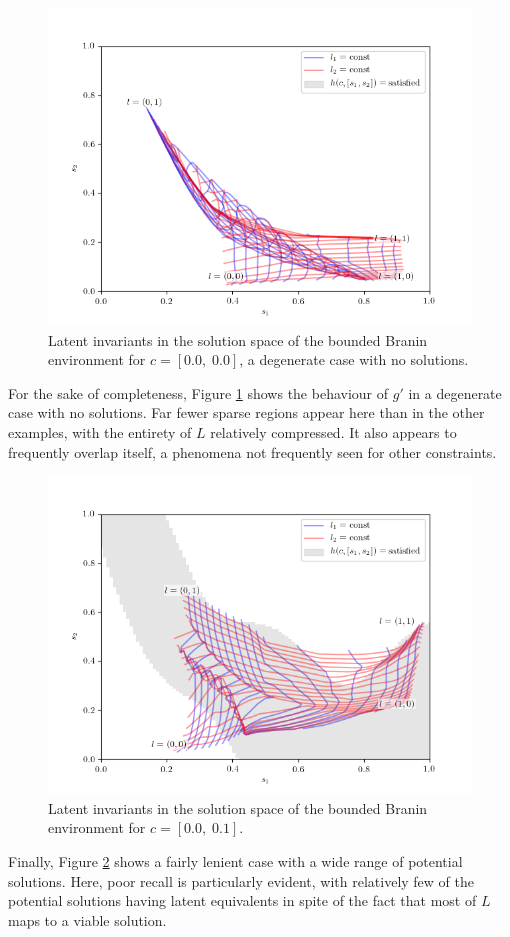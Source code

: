 \documentclass[../../main.tex]{subfiles}
\begin{document}
\begin{figure}[H]
    \begin{center}
    \includegraphics[width=\textwidth]{latentPlot0000}
    \caption{
        Latent invariants in the solution space of the bounded Branin environment for $c=[0.0,\;0.0]$, a degenerate case with no solutions.
    }
    \label{fig:latentPlot0000}
    \end{center}
\end{figure}
For the sake of completeness, Figure \ref{fig:latentPlot0000} shows the behaviour of $g'$ in a degenerate case with no solutions.
Far fewer sparse regions appear here than in the other examples, with the entirety of $L$ relatively compressed.
It also appears to frequently overlap itself, a phenomena not frequently seen for other constraints.
\begin{figure}[H]
    \begin{center}
    \includegraphics[width=\textwidth]{latentPlot0001}
    \caption{
        Latent invariants in the solution space of the bounded Branin environment for $c=[0.0,\;0.1]$.
    }
    \label{fig:latentPlot0001}
    \end{center}
\end{figure}
Finally, Figure \ref{fig:latentPlot0001} shows a fairly lenient case with a wide range of potential solutions.
Here, poor recall is particularly evident, with relatively few of the potential solutions having latent equivalents in spite of the fact that most of $L$ maps to a viable solution.
\end{document}
